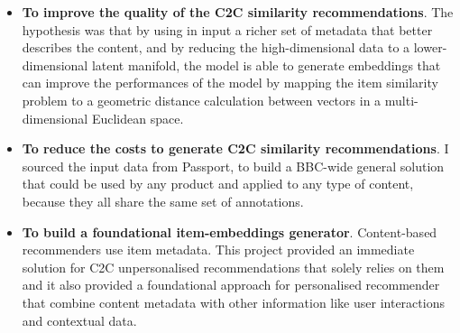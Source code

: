 \begin{itemize}
  \item \textbf{To improve the quality of the C2C similarity recommendations}. The hypothesis was that by using in input a richer set of metadata that
  better describes the content, and by reducing the high-dimensional data to a lower-dimensional latent manifold,
  the model is able to generate embeddings that can improve the performances of the model by mapping the
  item similarity problem to a geometric distance calculation between vectors in a multi-dimensional Euclidean space.
  \item \textbf{To reduce the costs to generate C2C similarity recommendations}. I sourced the input
  data from Passport, to build a BBC-wide general solution that could be used by any product and applied to any type of content,
  because they all share the same set of annotations.
  \item \textbf{To build a foundational item-embeddings generator}. Content-based recommenders
  use item metadata. This project provided an immediate solution for C2C unpersonalised recommendations that solely relies on them and
  it also provided a foundational approach for personalised recommender that combine content metadata with other information like user interactions
  and contextual data.
\end{itemize}
